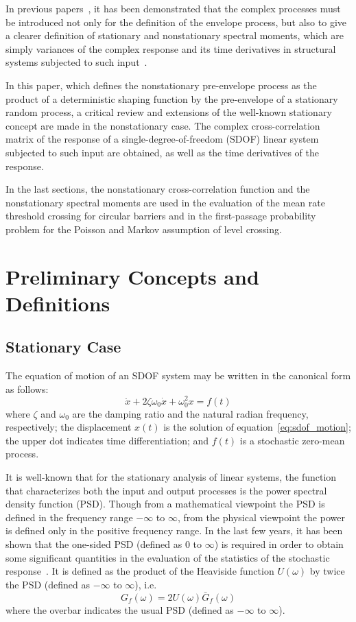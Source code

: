 \documentclass[12pt]{article}
\begin{document}
In previous papers~\cite{borino1988, dipaola1985}, it has been demonstrated that the complex processes must be introduced not only for the definition of the envelope process, but also to give a clearer definition of stationary and nonstationary spectral moments, which are simply variances of the complex response and its time derivatives in structural systems subjected to such input~\cite{dipaola1985}.

In this paper, which defines the nonstationary pre-envelope process as the product of a deterministic shaping function by the pre-envelope of a stationary random process, a critical review and extensions of the well-known stationary concept are made in the nonstationary case. The complex cross-correlation matrix of the response of a single-degree-of-freedom (SDOF) linear system subjected to such input are obtained, as well as the time derivatives of the response.

In the last sections, the nonstationary cross-correlation function and the nonstationary spectral moments are used in the evaluation of the mean rate threshold crossing for circular barriers and in the first-passage probability problem for the Poisson and Markov assumption of level crossing.

\section{Preliminary Concepts and Definitions}

\subsection{Stationary Case}
The equation of motion of an SDOF system may be written in the canonical form as follows:
\begin{equation}
    \ddot{x} + 2\zeta\omega_0 \dot{x} + \omega_0^2 x = f(t)
    \label{eq:sdof_motion}
\end{equation}
where $\zeta$ and $\omega_0$ are the damping ratio and the natural radian frequency, respectively; the displacement $x(t)$ is the solution of equation~\eqref{eq:sdof_motion}; the upper dot indicates time differentiation; and $f(t)$ is a stochastic zero-mean process.

It is well-known that for the stationary analysis of linear systems, the function that characterizes both the input and output processes is the power spectral density function (PSD). Though from a mathematical viewpoint the PSD is defined in the frequency range $-\infty$ to $\infty$, from the physical viewpoint the power is defined only in the positive frequency range. In the last few years, it has been shown that the one-sided PSD (defined as $0$ to $\infty$) is required in order to obtain some significant quantities in the evaluation of the statistics of the stochastic response~\cite{vanmarcke1972, vanmarcke1975}. It is defined as the product of the Heaviside function $U(\omega)$ by twice the PSD (defined as $-\infty$ to $\infty$), i.e.
\begin{equation}
    G_f(\omega) = 2 U(\omega) \bar{G}_f(\omega)
    \label{eq:one_sided_psd}
\end{equation}
where the overbar indicates the usual PSD (defined as $-\infty$ to $\infty$).
\end{document}
